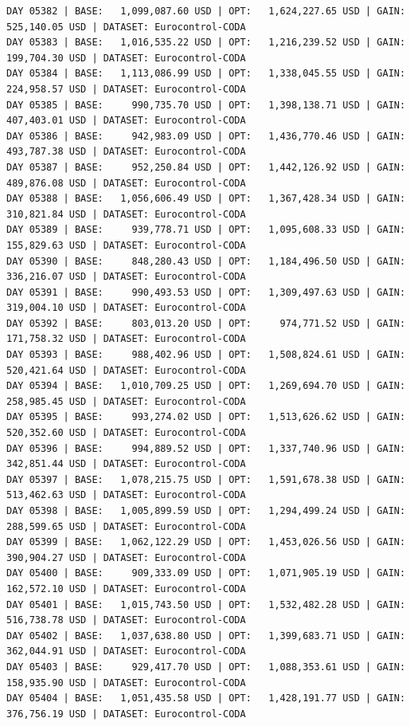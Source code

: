 \documentclass[11pt,a4paper]{article}
\begin{document}
\begin{verbatim}
DAY 05382 | BASE:   1,099,087.60 USD | OPT:   1,624,227.65 USD | GAIN: 525,140.05 USD | DATASET: Eurocontrol-CODA
DAY 05383 | BASE:   1,016,535.22 USD | OPT:   1,216,239.52 USD | GAIN: 199,704.30 USD | DATASET: Eurocontrol-CODA
DAY 05384 | BASE:   1,113,086.99 USD | OPT:   1,338,045.55 USD | GAIN: 224,958.57 USD | DATASET: Eurocontrol-CODA
DAY 05385 | BASE:     990,735.70 USD | OPT:   1,398,138.71 USD | GAIN: 407,403.01 USD | DATASET: Eurocontrol-CODA
DAY 05386 | BASE:     942,983.09 USD | OPT:   1,436,770.46 USD | GAIN: 493,787.38 USD | DATASET: Eurocontrol-CODA
DAY 05387 | BASE:     952,250.84 USD | OPT:   1,442,126.92 USD | GAIN: 489,876.08 USD | DATASET: Eurocontrol-CODA
DAY 05388 | BASE:   1,056,606.49 USD | OPT:   1,367,428.34 USD | GAIN: 310,821.84 USD | DATASET: Eurocontrol-CODA
DAY 05389 | BASE:     939,778.71 USD | OPT:   1,095,608.33 USD | GAIN: 155,829.63 USD | DATASET: Eurocontrol-CODA
DAY 05390 | BASE:     848,280.43 USD | OPT:   1,184,496.50 USD | GAIN: 336,216.07 USD | DATASET: Eurocontrol-CODA
DAY 05391 | BASE:     990,493.53 USD | OPT:   1,309,497.63 USD | GAIN: 319,004.10 USD | DATASET: Eurocontrol-CODA
DAY 05392 | BASE:     803,013.20 USD | OPT:     974,771.52 USD | GAIN: 171,758.32 USD | DATASET: Eurocontrol-CODA
DAY 05393 | BASE:     988,402.96 USD | OPT:   1,508,824.61 USD | GAIN: 520,421.64 USD | DATASET: Eurocontrol-CODA
DAY 05394 | BASE:   1,010,709.25 USD | OPT:   1,269,694.70 USD | GAIN: 258,985.45 USD | DATASET: Eurocontrol-CODA
DAY 05395 | BASE:     993,274.02 USD | OPT:   1,513,626.62 USD | GAIN: 520,352.60 USD | DATASET: Eurocontrol-CODA
DAY 05396 | BASE:     994,889.52 USD | OPT:   1,337,740.96 USD | GAIN: 342,851.44 USD | DATASET: Eurocontrol-CODA
DAY 05397 | BASE:   1,078,215.75 USD | OPT:   1,591,678.38 USD | GAIN: 513,462.63 USD | DATASET: Eurocontrol-CODA
DAY 05398 | BASE:   1,005,899.59 USD | OPT:   1,294,499.24 USD | GAIN: 288,599.65 USD | DATASET: Eurocontrol-CODA
DAY 05399 | BASE:   1,062,122.29 USD | OPT:   1,453,026.56 USD | GAIN: 390,904.27 USD | DATASET: Eurocontrol-CODA
DAY 05400 | BASE:     909,333.09 USD | OPT:   1,071,905.19 USD | GAIN: 162,572.10 USD | DATASET: Eurocontrol-CODA
DAY 05401 | BASE:   1,015,743.50 USD | OPT:   1,532,482.28 USD | GAIN: 516,738.78 USD | DATASET: Eurocontrol-CODA
DAY 05402 | BASE:   1,037,638.80 USD | OPT:   1,399,683.71 USD | GAIN: 362,044.91 USD | DATASET: Eurocontrol-CODA
DAY 05403 | BASE:     929,417.70 USD | OPT:   1,088,353.61 USD | GAIN: 158,935.90 USD | DATASET: Eurocontrol-CODA
DAY 05404 | BASE:   1,051,435.58 USD | OPT:   1,428,191.77 USD | GAIN: 376,756.19 USD | DATASET: Eurocontrol-CODA

\end{verbatim}
\end{document}
